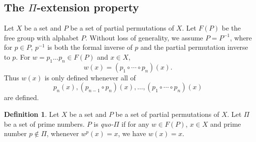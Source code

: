 \documentclass[11pt]{amsart}
\newtheorem{remark}[theorem]{Remark}
\theoremstyle{definition}
\newtheorem{definition}[theorem]{Definition}
\theoremstyle{definition}
\numberwithin{equation}{section}
\DeclareMathOperator{\Aut}{Aut}
\DeclareMathOperator{\Ker}{ker}
\begin{document}

\subsection{The $\Pi$-extension property}

Let $X$ be a set and $P$ be a set of partial permutations of $X$. Let $F(P)$ be the free group with alphabet $P$. Without loss of generality, we assume $P=P^{-1}$, where for $p\in P$, $p^{-1}$ is both the formal inverse of $p$ and the partial permutation inverse to $p$. For $w=p_1\dots p_n\in F(P)$ and $x\in X$, 
$$ w(x)=(p_1\circ \cdots \circ p_n)(x). $$
Thus $w(x)$ is only defined whenever all of $$p_n(x), (p_{n-1}\circ p_n)(x), \dots, (p_1\circ \cdots \circ p_n)(x)$$ are defined.

\begin{definition} Let $X$ be a set and $P$ be a set of partial permutations of $X$. Let $\Pi$ be a set of prime numbers. $P$ is {\em quo-$\Pi$} if for any $w\in F(P)$, $x\in X$ and prime number $p\not\in\Pi$, whenever $w^p(x)=x$, we have $w(x)=x$. 
\end{definition}
\end{document}
